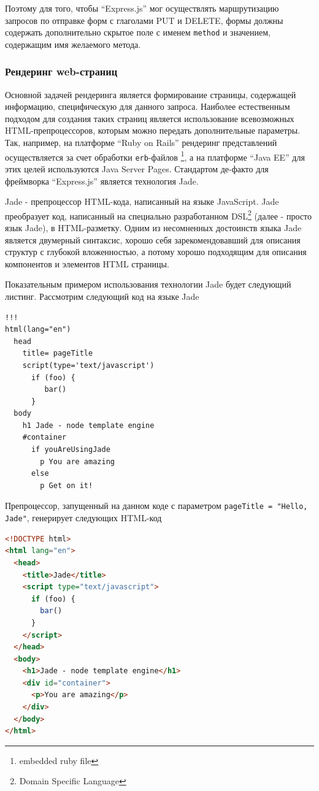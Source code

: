 \documentclass[14pt, a4paper]{extarticle}
\begin{document}
Поэтому для того, чтобы ``Express.js'' мог осуществлять маршрутизацию запросов по
отправке форм с глаголами PUT и DELETE, формы должны содержать дополнительно
скрытое поле с именем \texttt{method} и значением, содержащим имя желаемого
метода.

\subsubsection{Рендеринг web-страниц}

Основной задачей рендеринга является формирование страницы, содержащей
информацию, специфическую для данного запроса. Наиболее естественным подходом
для создания таких страниц является использование всевозможных
HTML-препроцессоров, которым можно передать дополнительные параметры.
Так, например, на платформе ``Ruby on Rails'' рендеринг представлений
осуществляется
за счет обработки \texttt{erb}-файлов \footnote{embedded ruby file}, а на
платформе ``Java EE'' для этих целей используются Java Server Pages. Стандартом
де-факто для фреймворка ``Express.js'' является технология Jade.

Jade\cite{jade} - препроцессор HTML-кода, написанный на языке JavaScript. Jade
преобразует код, написанный на специально разработанном DSL\footnote{Domain
Specific Language} (далее - просто язык Jade), в HTML-разметку. Одним из
несомненных достоинств языка Jade является двумерный синтаксис, хорошо себя
зарекомендовавший для описания структур с глубокой вложенностью, а потому
хорошо подходящим для описания компонентов и элементов HTML страницы.

Показательным примером использования технологии Jade будет следующий листинг.
Рассмотрим следующий код на языке Jade

\begin{lstlisting}
!!!
html(lang="en")
  head
    title= pageTitle
    script(type='text/javascript')
      if (foo) {
         bar()
      }
  body
    h1 Jade - node template engine
    #container
      if youAreUsingJade
        p You are amazing
      else
        p Get on it!
\end{lstlisting}

Препроцессор, запущенный на данном коде с параметром \texttt{pageTitle = "Hello,
Jade"}, генерирует следующих HTML-код

\begin{lstlisting}[language=html]
<!DOCTYPE html>
<html lang="en">
  <head>
    <title>Jade</title>
    <script type="text/javascript">
      if (foo) {
        bar()
      }
    </script>
  </head>
  <body>
    <h1>Jade - node template engine</h1>
    <div id="container">
      <p>You are amazing</p>
    </div>
  </body>
</html>
\end{lstlisting}
\end{document}
